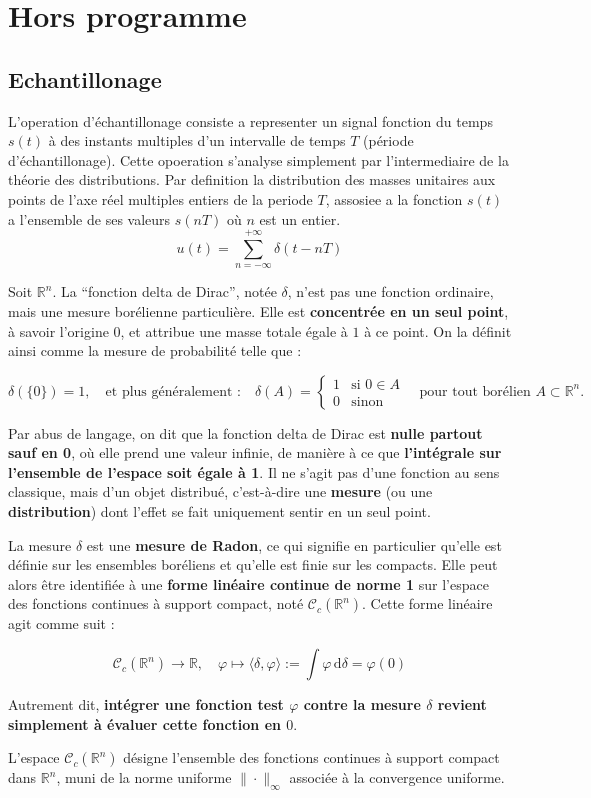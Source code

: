 \chapter{Hors programme}
\label{chap:hors-programme}

\section{Echantillonage}

L'operation d'\'echantillonage consiste a representer un signal fonction du temps 
\(s(t)\) \`a des instants multiples d'un intervalle de temps \(T\) (p\'eriode d'\'echantillonage).
Cette opoeration s'analyse simplement par l'intermediaire de la th\'eorie des distributions.
Par definition la distribution des masses unitaires aux points de l'axe r\'eel multiples 
entiers de la periode \(T\), assosiee a la fonction \(s(t)\) a l'ensemble de ses valeurs
\(s(nT)\) o\`u \(n\) est un entier.
\[
    u(t) = \sum_{n=-\infty}^{+\infty} \delta(t - nT)
\]

Soit $\mathbb{R}^n$. La ``fonction delta de Dirac'', notée $\delta$, n’est pas 
une fonction ordinaire, mais une mesure borélienne particulière. Elle est 
\textbf{concentrée en un seul point}, à savoir l’origine $0$, et attribue une 
masse totale égale à $1$ à ce point. On la définit ainsi comme la mesure de 
probabilité telle que :

\[
\delta(\{0\}) = 1, \quad \text{et plus généralement :} \quad \delta(A) = 
\begin{cases}
1 & \text{si } 0 \in A \\
0 & \text{sinon}
\end{cases}
\quad \text{pour tout borélien } A \subset \mathbb{R}^n.
\]

Par abus de langage, on dit que la fonction delta de Dirac est 
\textbf{nulle partout sauf en 0}, où elle prend une valeur infinie, de manière à 
ce que \textbf{l’intégrale sur l’ensemble de l’espace soit égale à 1}. Il ne 
s’agit pas d’une fonction au sens classique, mais d’un objet distribué, 
c’est-à-dire une \textbf{mesure} (ou une \textbf{distribution}) dont l’effet se 
fait uniquement sentir en un seul point.

La mesure $\delta$ est une \textbf{mesure de Radon}, ce qui signifie en 
particulier qu’elle est définie sur les ensembles boréliens et qu’elle est finie 
sur les compacts. Elle peut alors être identifiée à une 
\textbf{forme linéaire continue de norme 1} sur l’espace des fonctions continues 
à support compact, noté $\mathcal{C}_c(\mathbb{R}^n)$. Cette forme linéaire agit 
comme suit :

\[
\mathcal{C}_c(\mathbb{R}^n) \to \mathbb{R}, \quad \varphi \mapsto \langle \delta, \varphi \rangle := \int \varphi \, \mathrm{d}\delta = \varphi(0)
\]

Autrement dit, \textbf{intégrer une fonction test $\varphi$ contre la mesure 
$\delta$ revient simplement à évaluer cette fonction en $0$}.

L’espace $\mathcal{C}_c(\mathbb{R}^n)$ désigne l’ensemble des fonctions 
continues à support compact dans $\mathbb{R}^n$, muni de la norme uniforme 
$\|\cdot\|_\infty$ associée à la convergence uniforme.

